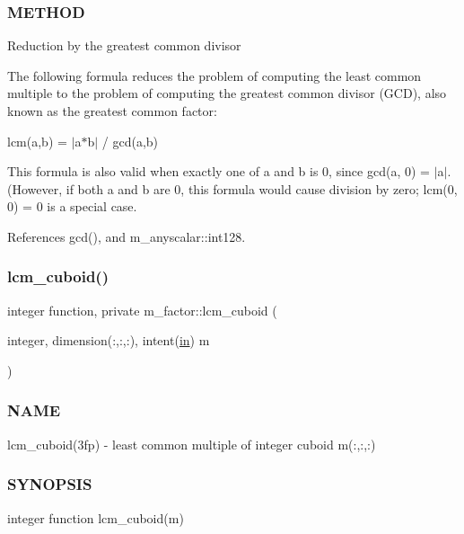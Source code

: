 \subsubsection*{M\+E\+T\+H\+OD}

Reduction by the greatest common divisor

The following formula reduces the problem of computing the least common multiple to the problem of computing the greatest common divisor (G\+CD), also known as the greatest common factor\+:

lcm(a,b) = $\vert$a$\ast$b$\vert$ / gcd(a,b)

This formula is also valid when exactly one of a and b is 0, since gcd(a, 0) = $\vert$a$\vert$. (However, if both a and b are 0, this formula would cause division by zero; lcm(0, 0) = 0 is a special case. 

References gcd(), and m\+\_\+anyscalar\+::int128.

\mbox{\label{namespacem__factor_ae9aed0802e2c5a923b255f143ddf6e15}} 
\subsubsection{\texorpdfstring{lcm\+\_\+cuboid()}{lcm\_cuboid()}}
{\footnotesize\ttfamily integer function, private m\+\_\+factor\+::lcm\+\_\+cuboid (\begin{DoxyParamCaption}\item[{integer, dimension(\+:,\+:,\+:), intent(\hyperlink{M__journal_83_8txt_afce72651d1eed785a2132bee863b2f38}{in})}]{m }\end{DoxyParamCaption})\hspace{0.3cm}{\ttfamily [private]}}



\subsubsection*{N\+A\+ME}

lcm\+\_\+cuboid(3fp) -\/ least common multiple of integer cuboid m(\+:,\+:,\+:) \subsubsection*{S\+Y\+N\+O\+P\+S\+IS}

integer function lcm\+\_\+cuboid(m)

